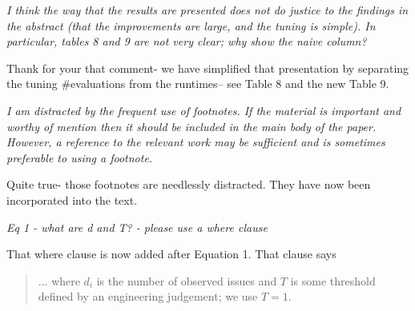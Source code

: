 {\em I think the way that the results are presented does not do justice to the findings in the abstract (that the improvements are large, and the tuning is simple). In particular, tables 8 and 9 are not very clear; why show the naive column?}

Thank for your that comment- we have simplified that presentation by separating the tuning \#evaluations from the runtimes-- see Table 8 and the new Table 9.

{\em I am distracted by the frequent use of footnotes. If the material is important and worthy of mention then it should be included in the main body of the paper. However, a reference to the relevant work may be sufficient and is sometimes preferable to using a footnote.}

Quite true- those footnotes are needlessly distracted.
They have now been incorporated into the text.



{\em  Eq 1 - what are d and T? - please use a where clause}



That where clause is now added after Equation 1. That clause says

\begin{quote} ... where  $d_i$ is the number of observed issues and $T$
is some threshold defined by an engineering judgement; we use $T=1$.\end{quote}



